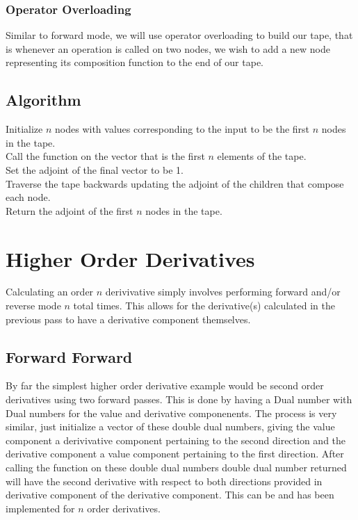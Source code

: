 \documentclass[a0,landscape]{a0poster}
\begin{document}
\begin{multicols}{4}
\subsubsection*{Operator Overloading}
Similar to forward mode, we will use operator overloading to build our tape, that
is whenever an operation is called on two nodes, we wish to add a new node
representing its composition function to the end of our tape.

\subsection*{Algorithm}
Initialize $n$ nodes with values corresponding to the input to be the first $n$ nodes in the tape. \\
Call the function on the vector that is the first $n$ elements of the tape. \\
Set the adjoint of the final vector to be 1. \\
Traverse the tape backwards updating the adjoint of the children that compose each node. \\
Return the adjoint of the first $n$ nodes in the tape. \\

\section*{Higher Order Derivatives}
Calculating an order $n$ derivivative simply involves performing forward and/or reverse mode
$n$ total times. This allows for the derivative(s) calculated in the previous pass to
have a derivative component themselves.

\subsection*{Forward Forward}
By far the simplest higher order derivative example would be second order derivatives using
two forward passes. This is done by having a Dual number with Dual numbers for the value and
derivative componenents. The process is very similar, just initialize a vector of
these double dual numbers, giving the value component a derivivative component 
pertaining to the second direction and the derivative component a value component pertaining
to the first direction. After calling the function on these double dual numbers double
dual number returned will have the second derivative with respect to both directions provided
in derivative component of the derivative component. This can be and has been implemented
for $n$ order derivatives.


\end{multicols}
\end{document}
